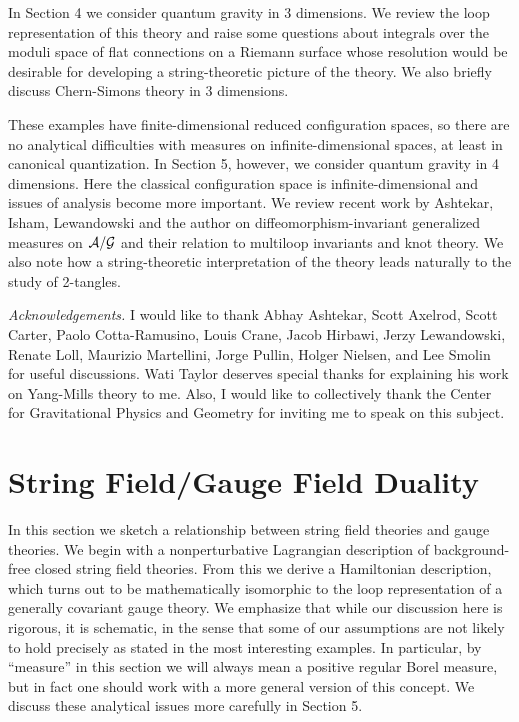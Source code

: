 \documentclass[12pt]{article}
\newcommand{\A}{{\cal A}}
\newcommand{\G}{{\cal G}}
\begin{document}
In Section 4 we consider quantum gravity in 3 dimensions.  We review the
loop representation of this theory and raise some questions about integrals
over the moduli space of flat connections on a Riemann surface whose
resolution would be desirable for developing a string-theoretic picture of
the theory.  We also briefly discuss Chern-Simons theory in 3 dimensions.

These examples have finite-dimensional reduced configuration spaces, so
there are no analytical difficulties with measures on infinite-dimensional
spaces, at least in canonical quantization. In Section 5, however, we
consider quantum gravity in 4 dimensions. Here the classical configuration
space is infinite-dimensional and issues of analysis become more important.
We review recent work by Ashtekar, Isham, Lewandowski and the author
\cite{AI,AL,Baez} on diffeomorphism-invariant generalized measures on
$\A/\G$ and their relation to multiloop invariants and knot theory.  We
also note how a string-theoretic interpretation of the theory leads
naturally to the study of 2-tangles.

{\it Acknowledgements.} I would like to thank Abhay Ashtekar, Scott
Axelrod, Scott Carter, Paolo Cotta-Ramusino, Louis Crane, Jacob Hirbawi,
Jerzy Lewandowski, Renate Loll,  Maurizio Martellini, Jorge Pullin,
Holger Nielsen, and Lee Smolin for useful discussions.   Wati Taylor
deserves special thanks for explaining his work on Yang-Mills theory to me.
Also, I would like to collectively thank the Center for Gravitational
Physics and Geometry for inviting me to speak on this subject.

\section{String Field/Gauge Field Duality}

In this section we sketch a relationship between  string field theories and
gauge theories.   We begin with a nonperturbative Lagrangian description of
background-free closed string field theories. From this we derive a
Hamiltonian description, which turns out to be mathematically isomorphic to
the loop representation of a generally covariant gauge theory.   We
emphasize that while our discussion here is rigorous, it is schematic, in
the sense that some of our assumptions are not likely to hold precisely as
stated in the most interesting examples.   In particular, by ``measure'' in
this section we will always mean a positive regular Borel measure,  but in
fact one should work with a more general version of this concept.   We
discuss these analytical issues more carefully in Section 5.
\end{document}
